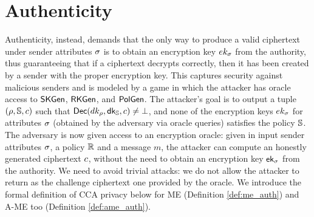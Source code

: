 \section{Authenticity}\label{sec:cca-auth}
Authenticity, instead, demands that the only way to produce a valid ciphertext under sender attributes $\sigma$ is to obtain an encryption key $ek_\sigma$ from the authority, thus guaranteeing that if a ciphertext decrypts correctly, then it has been created by a sender with the proper encryption key. This captures security against malicious senders and is modeled by a game in which the attacker has oracle access to $\mathsf{SKGen}$, $\mathsf{RKGen}$, and $\mathsf{PolGen}$.
The attacker's goal is to output a tuple $(\rho, \mathbb{S}, c)$ such that $\mathsf{Dec}(dk_\rho, \mathsf{dk}_{\mathbb{S}}, c) \not= \bot$, and none of the encryption keys $ek_\sigma$ for attributes $\sigma$ (obtained by the adversary via oracle queries) satisfies the policy $\mathbb{S}$.
\newline\newline
The adversary is now given access to an encryption oracle: given in input sender attributes $\sigma$, a policy $\mathbb{R}$ and a message $m$, the attacker can compute an honestly generated ciphertext $c$, without the need to obtain an encryption key $\mathsf{ek}_\sigma$ from the authority.
We need to avoid trivial attacks: we do not allow the attacker to return as the challenge ciphertext one provided by the oracle.
We introduce the formal definition of CCA privacy below for ME (Definition \ref{def:me_auth}) and A-ME too (Definition \ref{def:ame_auth}).




